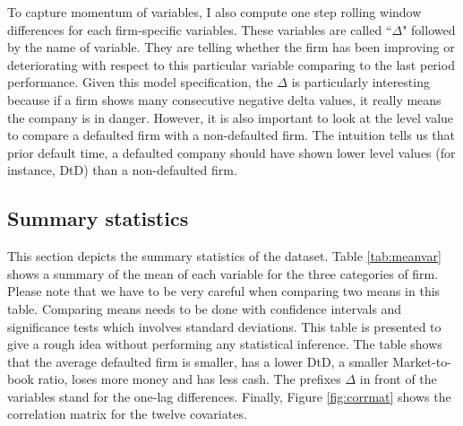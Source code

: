 To capture momentum of variables, I also compute one step rolling window differences for each firm-specific variables. These variables are called ``$\Delta$" followed by the name of variable. They are telling whether the firm has been improving or deteriorating with respect to this particular variable comparing to the last period performance. Given this model specification, the $\Delta$ is particularly interesting because if a firm shows many consecutive negative delta values, it really means the company is in danger. However, it is also important to look at the level value to compare a defaulted firm with a non-defaulted firm. The intuition tells us that prior default time, a defaulted company should have shown lower level values (for instance, DtD) than a non-defaulted firm.

\subsection{Summary statistics}
\label{sec3-2}

This section depicts the summary statistics of the dataset. Table \ref{tab:meanvar} shows a summary of the mean of each variable for the three categories of firm. Please note that we have to be very careful when comparing two means in this table. Comparing means needs to be done with confidence intervals and significance tests which involves standard deviations. This table is presented to give a rough idea without performing any statistical inference. The table shows that the average defaulted firm is smaller, has a lower DtD, a smaller Market-to-book ratio, loses more money and has less cash. The prefixes $\Delta$ in front of the variables stand for the one-lag differences. Finally, Figure \ref{fig:corrmat} shows the correlation matrix for the twelve covariates.

